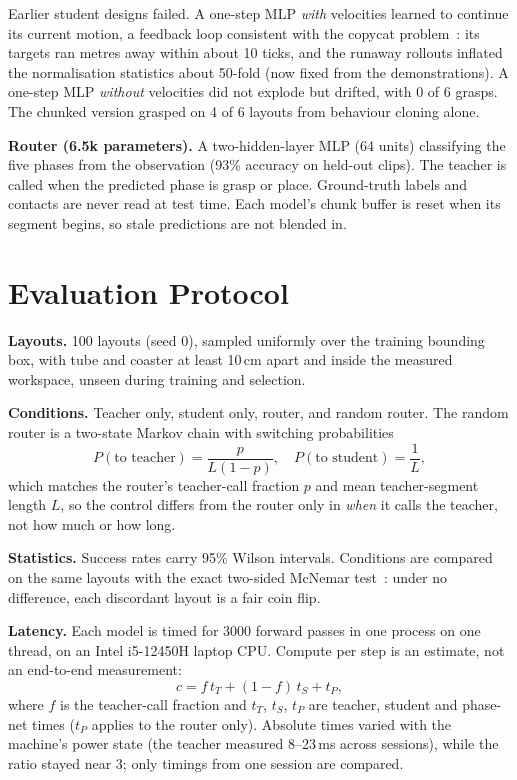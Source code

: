 \documentclass[10pt,twocolumn]{article}
\begin{document}
Earlier student designs failed. A one-step MLP \emph{with} velocities learned to continue its current motion, a
feedback loop consistent with the copycat problem~\cite{copycat}: its targets ran metres away within about 10 ticks,
and the runaway rollouts inflated the normalisation statistics about 50-fold (now fixed from the demonstrations). A
one-step MLP \emph{without} velocities did not explode but drifted, with 0 of 6 grasps. The chunked version grasped on
4 of 6 layouts from behaviour cloning alone.

\textbf{Router (6.5k parameters).} A two-hidden-layer MLP (64 units) classifying the five phases from the observation
(93\% accuracy on held-out clips). The teacher is called when the predicted phase is grasp or place. Ground-truth
labels and contacts are never read at test time. Each model's chunk buffer is reset when its segment begins, so stale
predictions are not blended in.

\section{Evaluation Protocol}
\textbf{Layouts.} 100 layouts (seed 0), sampled uniformly over the training bounding box, with tube and coaster at
least 10\,cm apart and inside the measured workspace, unseen during training and selection.

\textbf{Conditions.} Teacher only, student only, router, and random router. The random router is a two-state Markov
chain with switching probabilities
\begin{equation}
P(\text{to teacher}) = \frac{p}{L(1-p)},\quad P(\text{to student}) = \frac{1}{L},
\end{equation}
which matches the router's teacher-call fraction $p$ and mean teacher-segment length $L$, so the control differs from
the router only in \emph{when} it calls the teacher, not how much or how long.

\textbf{Statistics.} Success rates carry 95\% Wilson intervals. Conditions are compared on the same layouts with the
exact two-sided McNemar test~\cite{mcnemar}: under no difference, each discordant layout is a fair coin flip.

\textbf{Latency.} Each model is timed for 3000 forward passes in one process on one thread, on an Intel i5-12450H
laptop CPU. Compute per step is an estimate, not an end-to-end measurement:
\begin{equation}
c = f\,t_T + (1-f)\,t_S + t_P,
\end{equation}
where $f$ is the teacher-call fraction and $t_T$, $t_S$, $t_P$ are teacher, student and phase-net times ($t_P$ applies
to the router only). Absolute times varied with the machine's power state (the teacher measured 8--23\,ms across
sessions), while the ratio stayed near 3; only timings from one session are compared.
\end{document}
